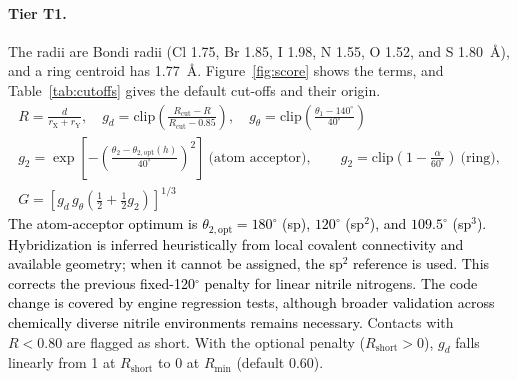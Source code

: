 \documentclass[journal=jcisd8,manuscript=suppinfo]{achemso}
\newcommand{\tcb}[1]{{\textcolor{black}{#1}}}
\begin{document}
\begin{singlespace}
\paragraph{Tier T1.} The radii are Bondi radii\cite{Bondi1964} (Cl 1.75, Br 1.85, I 1.98, N 1.55, O 1.52, and S \SI{1.80}{\angstrom}), and a ring centroid has \SI{1.77}{\angstrom}. Figure~\ref{fig:score} shows the terms, and Table~\ref{tab:cutoffs} gives the default cut-offs and their origin.
\begin{gather}
R=\frac{d}{r_\mathrm{X}+r_\mathrm{Y}},\quad g_d=\mathrm{clip}\!\left(\frac{R_\mathrm{cut}-R}{R_\mathrm{cut}-0.85}\right),\quad g_\theta=\mathrm{clip}\!\left(\frac{\theta_1-140^\circ}{40^\circ}\right)\\
g_2=\exp\!\left[-\left(\frac{\theta_2-\theta_{2,\mathrm{opt}}(h)}{40^\circ}\right)^2\right]\ \text{(atom acceptor)},\qquad g_2=\mathrm{clip}\!\left(1-\frac{\alpha}{60^\circ}\right)\ \text{(ring)},\\
G=\left[g_d\,g_\theta\left(\tfrac12+\tfrac12 g_2\right)\right]^{1/3}
\end{gather}
\tcb{The atom-acceptor optimum is $\theta_{2,\mathrm{opt}}=180^\circ$ (sp), $120^\circ$ (sp$^2$), and $109.5^\circ$ (sp$^3$). Hybridization is inferred heuristically from local covalent connectivity and available geometry; when it cannot be assigned, the sp$^2$ reference is used. This corrects the previous fixed-120$^\circ$ penalty for linear nitrile nitrogens. The code change is covered by engine regression tests, although broader validation across chemically diverse nitrile environments remains necessary.}
Contacts with $R < 0.80$ are flagged as short. With the optional penalty ($R_\mathrm{short} > 0$), $g_d$ falls linearly from 1 at $R_\mathrm{short}$ to 0 at $R_\mathrm{min}$ (default 0.60).


\end{singlespace}
\end{document}
